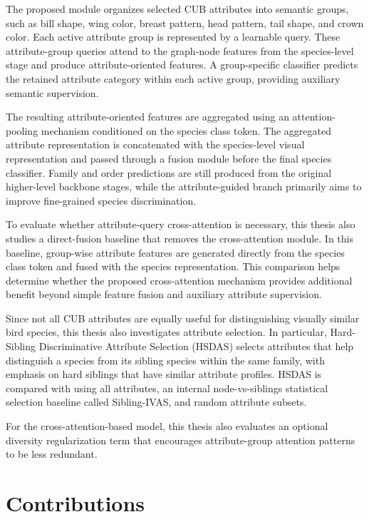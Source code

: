 The proposed module organizes selected CUB attributes into semantic groups, such as bill shape, wing color, breast pattern, head pattern, tail shape, and crown color. Each active attribute group is represented by a learnable query. These attribute-group queries attend to the graph-node features from the species-level stage and produce attribute-oriented features. A group-specific classifier predicts the retained attribute category within each active group, providing auxiliary semantic supervision.

The resulting attribute-oriented features are aggregated using an attention-pooling mechanism conditioned on the species class token. The aggregated attribute representation is concatenated with the species-level visual representation and passed through a fusion module before the final species classifier. Family and order predictions are still produced from the original higher-level backbone stages, while the attribute-guided branch primarily aims to improve fine-grained species discrimination.

To evaluate whether attribute-query cross-attention is necessary, this thesis also studies a direct-fusion baseline that removes the cross-attention module. In this baseline, group-wise attribute features are generated directly from the species class token and fused with the species representation. This comparison helps determine whether the proposed cross-attention mechanism provides additional benefit beyond simple feature fusion and auxiliary attribute supervision.

Since not all CUB attributes are equally useful for distinguishing visually similar bird species, this thesis also investigates attribute selection. In particular, Hard-Sibling Discriminative Attribute Selection (HSDAS) selects attributes that help distinguish a species from its sibling species within the same family, with emphasis on hard siblings that have similar attribute profiles. HSDAS is compared with using all attributes, an internal node-vs-siblings statistical selection baseline called Sibling-IVAS, and random attribute subsets.

For the cross-attention-based model, this thesis also evaluates an optional diversity regularization term that encourages attribute-group attention patterns to be less redundant.




\section{Contributions}

